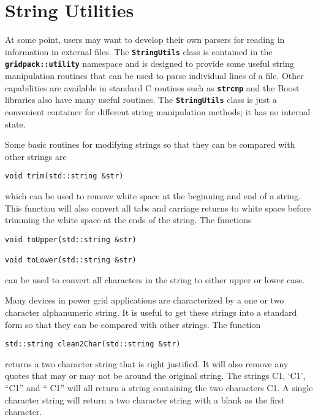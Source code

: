 \section{String Utilities}\label{string_utils}

At some point, users may want to develop their own parsers for reading in information in external files. The \texttt{\textbf{StringUtils}} class is contained in the \texttt{\textbf{gridpack::utility}} namespace and is designed to provide some useful string manipulation routines that can be used to parse individual lines of a file. Other capabilities are available in standard C routines such as \texttt{\textbf{strcmp}} and the Boost libraries also have many useful routines. The \texttt{\textbf{StringUtils}} class is just a convenient container for different string manipulation methods; it has no internal state.

Some basic routines for modifying strings so that they can be compared with other strings are

{
\color{red}
\begin{Verbatim}[fontseries=b]
void trim(std::string &str)
\end{Verbatim}
}

which can be used to remove white space at the beginning and end of a string. This function will also convert all tabs and carriage returns to white space before trimming the white space at the ends of the string. The functions

{
\color{red}
\begin{Verbatim}[fontseries=b]
void toUpper(std::string &str)

void toLower(std::string &str)
\end{Verbatim}
}

can be used to convert all characters in the string to either upper or lower case.

Many devices in power grid applications are characterized by a one or two character alphanumeric string. It is useful to get these strings into a standard form so that they can be compared with other strings. The function

{
\color{red}
\begin{Verbatim}[fontseries=b]
std::string clean2Char(std::string &str)
\end{Verbatim}
}

returns a two character string that is right justified. It will also remove any quotes that may or may not be around the original string. The strings C1, `C1', ``C1'' and ``  C1'' will all return a string containing the two characters C1. A single character string will return a two character string with a blank as the first character.

